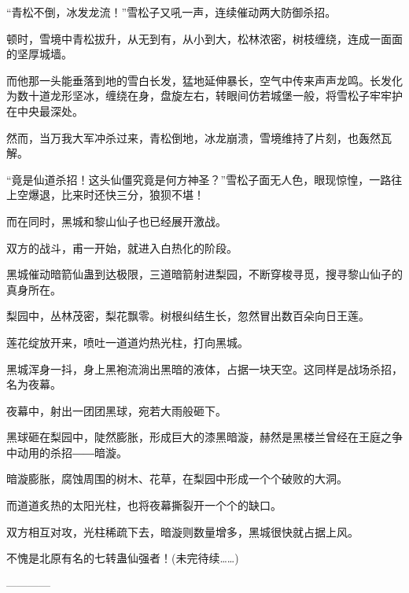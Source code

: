\begin{this_body}
“青松不倒，冰发龙流！”雪松子又吼一声，连续催动两大防御杀招。

顿时，雪境中青松拔升，从无到有，从小到大，松林浓密，树枝缠绕，连成一面面的坚厚城墙。

而他那一头能垂落到地的雪白长发，猛地延伸暴长，空气中传来声声龙鸣。长发化为数十道龙形坚冰，缠绕在身，盘旋左右，转眼间仿若城堡一般，将雪松子牢牢护在中央最深处。

然而，当万我大军冲杀过来，青松倒地，冰龙崩溃，雪境维持了片刻，也轰然瓦解。

“竟是仙道杀招！这头仙僵究竟是何方神圣？”雪松子面无人色，眼现惊惶，一路往上空爆退，比来时还快三分，狼狈不堪！

而在同时，黑城和黎山仙子也已经展开激战。

双方的战斗，甫一开始，就进入白热化的阶段。

黑城催动暗箭仙蛊到达极限，三道暗箭射进梨园，不断穿梭寻觅，搜寻黎山仙子的真身所在。

梨园中，丛林茂密，梨花飘零。树根纠结生长，忽然冒出数百朵向日王莲。

莲花绽放开来，喷吐一道道灼热光柱，打向黑城。

黑城浑身一抖，身上黑袍流淌出黑暗的液体，占据一块天空。这同样是战场杀招，名为夜幕。

夜幕中，射出一团团黑球，宛若大雨般砸下。

黑球砸在梨园中，陡然膨胀，形成巨大的漆黑暗漩，赫然是黑楼兰曾经在王庭之争中动用的杀招――暗漩。

暗漩膨胀，腐蚀周围的树木、花草，在梨园中形成一个个破败的大洞。

而道道炙热的太阳光柱，也将夜幕撕裂开一个个的缺口。

双方相互对攻，光柱稀疏下去，暗漩则数量增多，黑城很快就占据上风。

不愧是北原有名的七转蛊仙强者！(未完待续……)

------------

\end{this_body}

